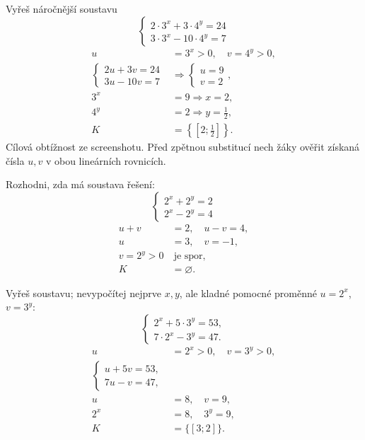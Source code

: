 \documentclass[11pt,a4paper]{article}
\begin{document}
\begin{prikladReseniBox}[title={Příklad 3}]
Vyřeš náročnější soustavu \[
\begin{cases}2\cdot3^x+3\cdot4^y=24\\3\cdot3^x-10\cdot4^y=7\end{cases}
\]
\tcblower
\[
\begin{aligned}u&=3^x>0,\quad v=4^y>0,\\\begin{cases}2u+3v=24\\3u-10v=7\end{cases}&\Longrightarrow\begin{cases}u=9\\v=2\end{cases},\\3^x&=9\Rightarrow x=2,\\4^y&=2\Rightarrow y=\frac{1}{2},\\K&=\left\{\left[2;\frac{1}{2}\right]\right\}.\end{aligned}
\]
Cílová obtížnost ze screenshotu. Před zpětnou substitucí nech žáky ověřit získaná čísla $u,v$ v obou lineárních rovnicích.
\end{prikladReseniBox}
\begin{prikladReseniBox}[title={Příklad 4}]
Rozhodni, zda má soustava řešení: \[
\begin{cases}2^x+2^y=2\\2^x-2^y=4\end{cases}
\]
\tcblower
\[
\begin{aligned}u+v&=2,\quad u-v=4,\\u&=3,\quad v=-1,\\v=2^y>0&\ \text{je spor},\\K&=\varnothing.\end{aligned}
\]

\end{prikladReseniBox}
\begin{prikladReseniBox}[title={Příklad 5}]
Vyřeš soustavu; nevypočítej nejprve $x,y$, ale kladné pomocné proměnné $u=2^x$, $v=3^y$:
\[
\begin{cases}
2^x+5\cdot3^y=53,\\
7\cdot2^x-3^y=47.
\end{cases}
\]
\tcblower
\[
\begin{aligned}u&=2^x>0,\quad v=3^y>0,\\
\begin{cases}u+5v=53,\\7u-v=47,\end{cases}\\
u&=8,\quad v=9,\\
2^x&=8,\quad3^y=9,\\
K&=\{[3;2]\}.
\end{aligned}
\]
\end{prikladReseniBox}
\end{document}
